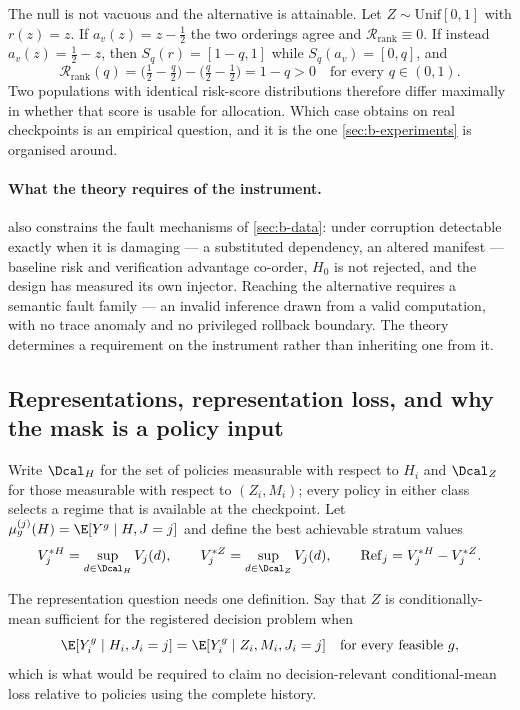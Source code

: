 The null is not vacuous and the alternative is attainable.  Let $Z\sim
\mathrm{Unif}[0,1]$ with $r(z)=z$.  If $a_v(z)=z-\tfrac12$ the two orderings
agree and $\mathcal R_{\mathrm{rank}}\equiv0$.  If instead
$a_v(z)=\tfrac12-z$, then $S_q(r)=[1-q,1]$ while $S_q(a_v)=[0,q]$, and
\begin{equation}
 \mathcal R_{\mathrm{rank}}(q)
 =\Big(\tfrac12-\tfrac q2\Big)-\Big(\tfrac q2-\tfrac12\Big)=1-q>0
 \quad\text{for every }q\in(0,1).
 \label{eq:construction}
\end{equation}
Two populations with identical risk-score distributions therefore differ
maximally in whether that score is usable for allocation.  Which case obtains on
real checkpoints is an empirical question, and it is the one
\cref{sec:b-experiments} is organised around.

\paragraph{What the theory requires of the instrument.}
 also constrains the fault mechanisms of
\cref{sec:b-data}: under corruption detectable exactly when it is damaging
--- a substituted dependency, an altered manifest --- baseline risk and
verification advantage co-order, $H_0$ is not rejected, and the design has
measured its own injector.  Reaching the alternative requires a semantic fault
family --- an invalid inference drawn from a valid computation, with no trace
anomaly and no privileged rollback boundary.  The theory determines a
requirement on the instrument rather than inheriting one from it.

\subsection{Representations, representation loss, and why the mask is a policy input}

Write $\Dcal_H$ for the set of policies measurable with respect to $H_i$ and
$\Dcal_Z$ for those measurable with respect to $(Z_i,M_i)$; every policy in
either class selects a regime that is available at the checkpoint.  Let
$\mu^{(j)}_g(H)=\E[Y^g\mid H,J=j]$ and define the best achievable stratum values
\begin{equation}
 V^{*H}_j=\sup_{d\in\Dcal_H}V_j(d),
 \qquad
 V^{*Z}_j=\sup_{d\in\Dcal_Z}V_j(d),
 \qquad
 \mathrm{Ref}_j=V^{*H}_j-V^{*Z}_j .
 \label{eq:refinement}
\end{equation}

The representation question needs one definition.  Say that $Z$ is
conditionally-mean sufficient for the registered decision problem when
\begin{equation}
 \E[Y^g_i\mid H_i,J_i=j]=\E[Y^g_i\mid Z_i,M_i,J_i=j]
 \quad\text{for every feasible }g,
 \label{eq:conditional-mean-sufficiency}
\end{equation}
which is what would be required to claim no decision-relevant conditional-mean
loss relative to policies using the complete history.

